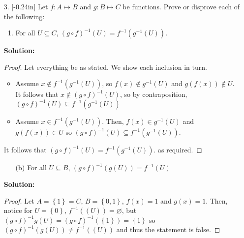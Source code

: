 \documentclass[letterpaper,12pt]{article}
\newcommand{\set}[1]{\left\{ #1 \right\}}
\theoremstyle{definition}
\begin{document}
\begin{enumerate}
    \item[3. ]\reversemarginpar{}[-0.24in] Let $f: A \mapsto B$ and $g: B \mapsto C$ be functions. Prove or disprove each of the following: \begin{enumerate}
        \item For all $U \subseteq C$, $(g \circ f)^{-1} (U) = f^{-1}(g^{-1}(U))$.
        
    \end{enumerate}
     \begin{mdframed}
            \textbf{Solution:} 
           \begin{proof}
              Let everything be as stated. We show each inclusion in turn. \begin{itemize}
                  \item Assume $x \notin f^{-1}(g^{-1}(U))$, so $f(x) \notin g^{-1}(U)$ and $g(f (x)) \notin U$. It follows that $x \notin (g \circ f)^{-1} (U)$, so by contraposition, $(g \circ f)^{-1} (U) \subseteq f^{-1}(g^{-1}(U))$
                  \item Assume $x \in f^{-1}(g^{-1}(U))$. Then, $f(x) \in g^{-1}(U)$ and $g(f(x)) \in U$ so $(g \circ f)^{-1} (U) \subseteq f^{-1}(g^{-1}(U))$.
              \end{itemize}
              It follows that $(g \circ f)^{-1} (U) = f^{-1}(g^{-1}(U))$. as required.
           \end{proof} 
        \end{mdframed}
\end{enumerate}
\pagebreak
\begin{enumerate}
    \item[] \begin{enumerate}
        \item[(b)] For all $U \subseteq B$, $(g\circ f)^{-1}(g(U)) = f^{-1}(U)$
    \end{enumerate}
     \begin{mdframed}
            \textbf{Solution:}
            \renewcommand{\proofname}{Disproof} \begin{proof}
                Let $A = \set{1} = C$, $B = \set{0,1}$, $f(x) = 1$ and $g(x) = 1$. Then, notice for $U = \set{0}$, $f^{-1}((U)) = \varnothing$, but $(g\circ f)^{-1}g(U) = (g\circ f)^{-1} (\set{1}) = \set{1}$ so $(g\circ f)^{-1}(g(U)) \neq f^{-1}((U))$ and thus the statement is false.
            \end{proof}
        \end{mdframed}
\end{enumerate}
\end{document}
